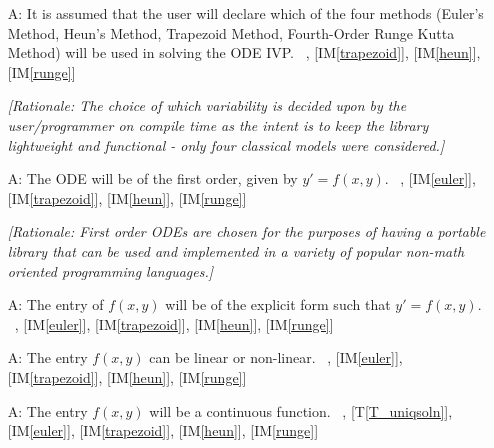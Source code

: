 \documentclass[12pt]{article}
\newcommand{\tref}[1]{T\ref{#1}}
\newcounter{assumpnum} %
\newcommand{\iref}[1]{IM\ref{#1}}
\begin{document}
\begin{itemize}


\item[A\refstepcounter{assumpnum}\theassumpnum \label{A_programcalls}:]
It is assumed that the user will declare which of the four methods (Euler's Method, Heun's
Method, Trapezoid Method, Fourth-Order Runge Kutta Method) will be used in solving
the ODE IVP.
~\newline
[\iref{euler}], [\iref{trapezoid}], [\iref{heun}], [\iref{runge}]

\textit{[Rationale: The choice of which variability is decided upon by the user/programmer
on compile time as the intent is to keep the library lightweight and functional - only four
classical models were considered.]}

\item[A\refstepcounter{assumpnum}\theassumpnum \label{A_typeoff}:]
The ODE will be of the first order, given by $y' = f(x, y)$.
~\newline
[\tref{T_ODE}], [\iref{euler}], [\iref{trapezoid}], [\iref{heun}], [\iref{runge}]

\textit{[Rationale: First order ODEs are chosen for the purposes of having a portable
library that can be used and implemented in a variety of popular non-math oriented programming
languages.]}

\item[A\refstepcounter{assumpnum}\theassumpnum \label{A_explicit}:]
The entry of $f(x, y)$ will be of the explicit form such that $y' = f(x, y)$.
~\newline
[\tref{T_ODE}], [\iref{euler}], [\iref{trapezoid}], [\iref{heun}], [\iref{runge}]

\item[A\refstepcounter{assumpnum}\theassumpnum \label{A_linearity}:]
The entry $f(x, y)$ can be linear or non-linear.
~\newline
[\tref{T_ODE}], [\iref{euler}], [\iref{trapezoid}], [\iref{heun}], [\iref{runge}]

\item[A\refstepcounter{assumpnum}\theassumpnum \label{A_continuous}:]
The entry $f(x, y)$ will be a continuous function.
~\newline
[\tref{T_ODE}], [\tref{T_uniqsoln}],
[\iref{euler}], [\iref{trapezoid}], [\iref{heun}], [\iref{runge}]


\end{itemize}
\end{document}
